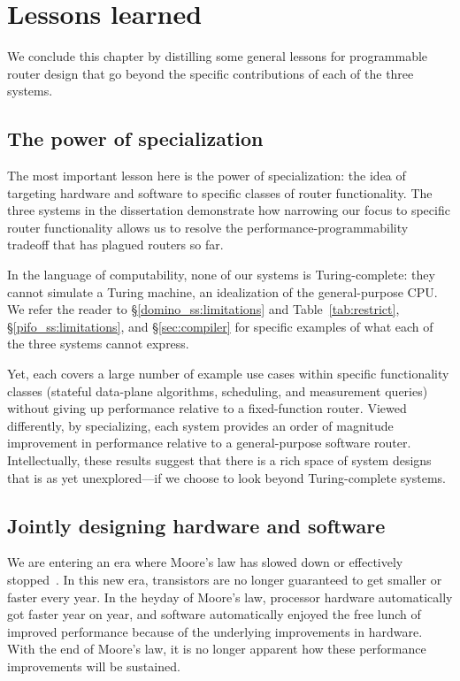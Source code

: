 \section{Lessons learned} We conclude this chapter by distilling some general
lessons for programmable router design that go beyond the specific
contributions of each of the three systems.

\subsection{The power of specialization} The most important lesson here  is the
power of specialization: the idea of targeting hardware and software to
specific classes of router functionality.  The three systems in the
dissertation demonstrate how narrowing our focus to specific router
functionality allows us to resolve the performance-programmability tradeoff
that has plagued routers so far.

In the language of computability, none of our systems is Turing-complete: they
cannot simulate a Turing machine, an idealization of the general-purpose CPU.
We refer the reader to \S\ref{domino_ss:limitations} and
Table~\ref{tab:restrict}, \S\ref{pifo_ss:limitations}, and
\S\ref{sec:compiler} for specific examples of what each of the three
systems cannot express.

Yet, each covers a large number of example use cases within specific
functionality classes (stateful data-plane algorithms, scheduling, and
measurement queries) without giving up performance relative to a fixed-function
router. Viewed differently, by specializing, each system provides an order of
magnitude improvement in performance relative to a general-purpose software
router. Intellectually, these results suggest that there is a rich space of
system designs that is as yet unexplored---if we choose to look beyond
Turing-complete systems. 

\subsection{Jointly designing hardware and software} We are entering an era
where Moore's law has slowed down or effectively stopped~\cite{dark_silicon,
four_horsemen}.  In this new era, transistors are no longer guaranteed to get
smaller or faster every year. In the heyday of Moore's law, processor hardware
automatically got faster year on year, and software automatically enjoyed the
free lunch of improved performance because of the underlying improvements in
hardware. With the end of Moore's law, it is no longer apparent how these
performance improvements will be sustained.

